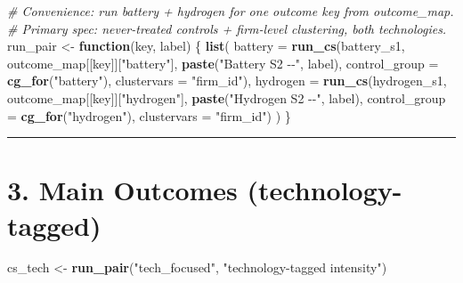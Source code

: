 \documentclass[
]{article}
\newenvironment{Shaded}{\begin{snugshade}}{\end{snugshade}}
\newcommand{\AttributeTok}[1]{\textcolor[rgb]{0.13,0.29,0.53}{#1}}
\newcommand{\CommentTok}[1]{\textcolor[rgb]{0.56,0.35,0.01}{\textit{#1}}}
\newcommand{\ControlFlowTok}[1]{\textcolor[rgb]{0.13,0.29,0.53}{\textbf{#1}}}
\newcommand{\FunctionTok}[1]{\textcolor[rgb]{0.13,0.29,0.53}{\textbf{#1}}}
\newcommand{\NormalTok}[1]{#1}
\newcommand{\OtherTok}[1]{\textcolor[rgb]{0.56,0.35,0.01}{#1}}
\newcommand{\StringTok}[1]{\textcolor[rgb]{0.31,0.60,0.02}{#1}}
\begin{document}
\begin{Shaded}
\begin{Highlighting}[]
\CommentTok{\# Convenience: run battery + hydrogen for one outcome key from outcome\_map.}
\CommentTok{\# Primary spec: never{-}treated controls + firm{-}level clustering, both technologies.}
\NormalTok{run\_pair }\OtherTok{\textless{}{-}} \ControlFlowTok{function}\NormalTok{(key, label) \{}
  \FunctionTok{list}\NormalTok{(}
    \AttributeTok{battery  =} \FunctionTok{run\_cs}\NormalTok{(battery\_s1,  outcome\_map[[key]][}\StringTok{"battery"}\NormalTok{],}
                      \FunctionTok{paste}\NormalTok{(}\StringTok{"Battery S2 {-}{-}"}\NormalTok{, label),}
                      \AttributeTok{control\_group =} \FunctionTok{cg\_for}\NormalTok{(}\StringTok{"battery"}\NormalTok{),}
                      \AttributeTok{clustervars   =} \StringTok{"firm\_id"}\NormalTok{),}
    \AttributeTok{hydrogen =} \FunctionTok{run\_cs}\NormalTok{(hydrogen\_s1, outcome\_map[[key]][}\StringTok{"hydrogen"}\NormalTok{],}
                      \FunctionTok{paste}\NormalTok{(}\StringTok{"Hydrogen S2 {-}{-}"}\NormalTok{, label),}
                      \AttributeTok{control\_group =} \FunctionTok{cg\_for}\NormalTok{(}\StringTok{"hydrogen"}\NormalTok{),}
                      \AttributeTok{clustervars   =} \StringTok{"firm\_id"}\NormalTok{)}
\NormalTok{  )}
\NormalTok{\}}
\end{Highlighting}
\end{Shaded}

\begin{center}\rule{0.5\linewidth}{0.5pt}\end{center}

\section{3. Main Outcomes
(technology-tagged)}\label{main-outcomes-technology-tagged}

\begin{Shaded}
\begin{Highlighting}[]
\NormalTok{cs\_tech }\OtherTok{\textless{}{-}} \FunctionTok{run\_pair}\NormalTok{(}\StringTok{"tech\_focused"}\NormalTok{, }\StringTok{"technology{-}tagged intensity"}\NormalTok{)}
\end{Highlighting}
\end{Shaded}
\end{document}
